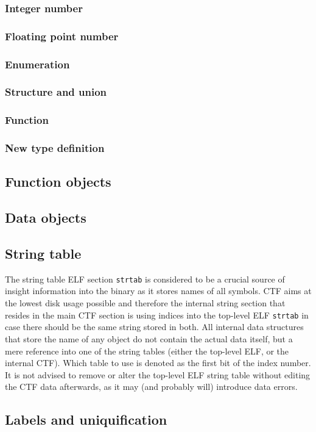 \subsubsection{Integer number}

\subsubsection{Floating point number}

\subsubsection{Enumeration}

\subsubsection{Structure and union}

\subsubsection{Function}

\subsubsection{New type definition}

\subsection{Function objects}

\subsection{Data objects}

\subsection{String table}
The string table ELF section \texttt{strtab} is considered to be a crucial
source of insight information into the binary as it stores names of all
symbols. CTF aims at the lowest disk usage possible and therefore the internal
string section that resides in the main CTF section is using indices into the
top-level ELF \texttt{strtab} in case there should be the same string stored in
both.  All internal data structures that store the name of any object do not
contain the actual data itself, but a mere reference into one of the string
tables (either the top-level ELF, or the internal CTF). Which table to use
is denoted as the first bit of the index number. It is not advised to remove or
alter the top-level ELF string table without editing the CTF data afterwards,
as it may (and probably will) introduce data errors.

\subsection{Labels and uniquification}

